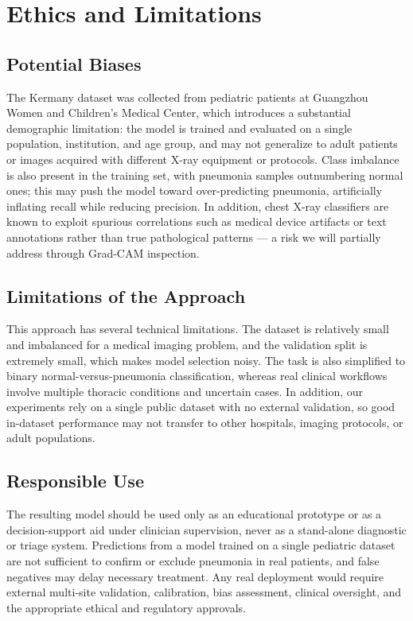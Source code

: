 \documentclass[acmsmall,screen,nonacm]{acmart}
\begin{document}
\section{Ethics and Limitations}

\subsection{Potential Biases}
The Kermany dataset was collected from pediatric patients at Guangzhou Women and Children's Medical Center, which introduces a substantial demographic limitation: the model is trained and evaluated on a single population, institution, and age group, and may not generalize to adult patients or images acquired with different X-ray equipment or protocols. Class imbalance is also present in the training set, with pneumonia samples outnumbering normal ones; this may push the model toward over-predicting pneumonia, artificially inflating recall while reducing precision. In addition, chest X-ray classifiers are known to exploit spurious correlations such as medical device artifacts or text annotations rather than true pathological patterns — a risk we will partially address through Grad-CAM inspection.

\subsection{Limitations of the Approach}
This approach has several technical limitations. The dataset is relatively small and imbalanced for a medical imaging problem, and the validation split is extremely small, which makes model selection noisy. The task is also simplified to binary normal-versus-pneumonia classification, whereas real clinical workflows involve multiple thoracic conditions and uncertain cases. In addition, our experiments rely on a single public dataset with no external validation, so good in-dataset performance may not transfer to other hospitals, imaging protocols, or adult populations.

\subsection{Responsible Use}
The resulting model should be used only as an educational prototype or as a decision-support aid under clinician supervision, never as a stand-alone diagnostic or triage system. Predictions from a model trained on a single pediatric dataset are not sufficient to confirm or exclude pneumonia in real patients, and false negatives may delay necessary treatment. Any real deployment would require external multi-site validation, calibration, bias assessment, clinical oversight, and the appropriate ethical and regulatory approvals.



\end{document}

